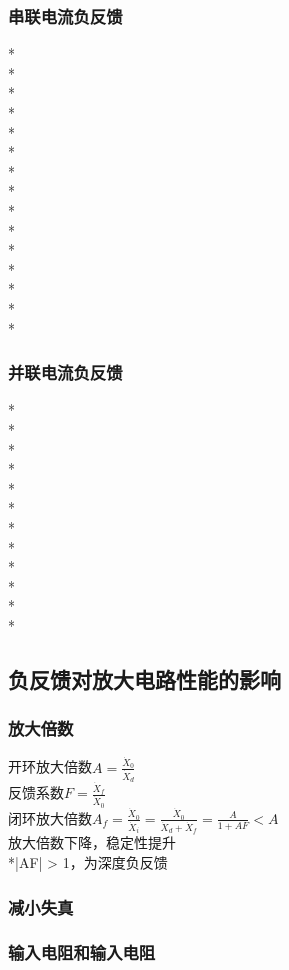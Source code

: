 \documentclass[UTF8, fontset=none]{ctexart}
\begin{document}
\begin{multicols*}{8}
\subsubsection{串联电流负反馈}
*\\
*\\
*\\
*\\
*\\
*\\
*\\
*\\
*\\
*\\
*\\
*\\
*\\
*\\
*
\subsubsection{并联电流负反馈}
*\\
*\\
*\\
*\\
*\\
*\\
*\\
*\\
*\\
*\\
*\\
*
\subsection{负反馈对放大电路性能的影响}
\subsubsection{放大倍数}
开环放大倍数$A = \frac{{{{\dot X}_0}}}{{{{\dot X}_d}}}$\\
反馈系数$F = \frac{{{{\dot X}_f}}}{{{{\dot X}_0}}}$\\
闭环放大倍数${A_f} = \frac{{{{\dot X}_0}}}{{{{\dot X}_i}}} = \frac{{{{\dot X}_0}}}{{{{\dot X}_d} + {{\dot X}_f}}} = \frac{A}{{1 + AF}} < A$\\
放大倍数下降，稳定性提升\\
*|AF| > 1，为深度负反馈\\%
\subsubsection{减小失真}%
\subsubsection{输入电阻和输入电阻}

\end{multicols*}
\end{document}
